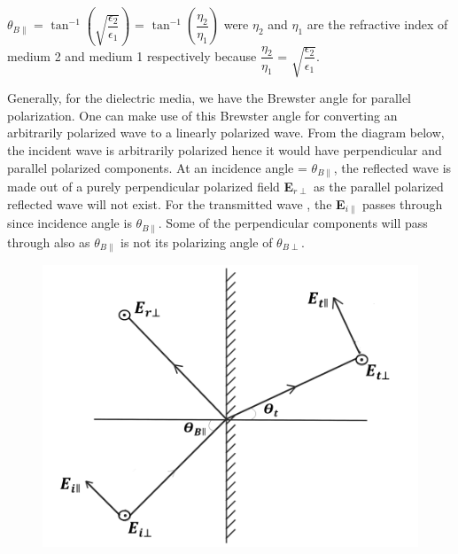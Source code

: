 $\theta_{B\parallel}$ = $\tan^{-1}\left(\sqrt{\dfrac{\epsilon_2}{\epsilon_1}}\right)$ = $\tan^{-1}\left(\dfrac{\eta_2}{\eta_1}\right)$ were $\eta_2$ and $\eta_1$ are the refractive index of medium 2 and medium 1 respectively because $\dfrac{\eta_2}{\eta_1}$ = $\sqrt{\dfrac{\epsilon_2}{\epsilon_1}}$.

Generally, for the dielectric media, we have the Brewster angle for parallel polarization. One can make use of this Brewster angle for converting an arbitrarily polarized wave to a linearly polarized wave. From the diagram below, the incident wave is arbitrarily polarized hence it would have perpendicular and parallel polarized components. At an incidence angle = $\theta_{B\parallel}$, the reflected wave is made out of a purely perpendicular polarized field \textbf{E}$_{r\perp}$ as the parallel polarized reflected wave will not exist. For the transmitted wave , the \textbf{E}$_{i\parallel}$ passes through since incidence angle is $\theta_{B\parallel}$. Some of the perpendicular components will pass through also as $\theta_{B\parallel}$ is not its polarizing angle of $\theta_{B\perp}$.

\begin{figure}[h]
\centering
\includegraphics[width=1\linewidth]{./graphics/No_parallel_reflected_wave}
\caption{}
\label{}
\end{figure}

